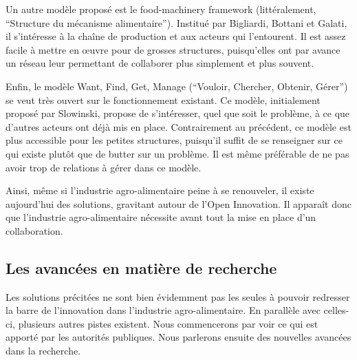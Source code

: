\documentclass[a4paper,10pt]{report}
\begin{document}
			Un autre modèle proposé est le food-machinery framework (littéralement, “Structure du mécanisme alimentaire”). Institué par Bigliardi, Bottani et Galati, il s’intéresse à la chaîne de production et aux acteurs qui l’entourent\cite{FMF}. Il est assez facile à mettre en œuvre pour de grosses structures, puisqu’elles ont par avance un réseau leur permettant de collaborer plus simplement et plus souvent.
			
			Enfin, le modèle Want, Find, Get, Manage (“Vouloir, Chercher, Obtenir, Gérer”) se veut très ouvert sur le fonctionnement existant. Ce modèle, initialement proposé par Slowinski\cite{WFGM}, propose de s’intéresser, quel que soit le problème, à ce que d’autres acteurs ont déjà mis en place. Contrairement au précédent, ce modèle est plus accessible pour les petites structures, puisqu’il suffit de se renseigner sur ce qui existe plutôt que de butter sur un problème. Il est même préférable de ne pas avoir trop de relations à gérer dans ce modèle.
			
			Ainsi, même si l’industrie agro-alimentaire peine à se renouveler, il existe aujourd’hui des solutions, gravitant autour de l’Open Innovation. Il apparaît donc que l’industrie agro-alimentaire nécessite avant tout la mise en place d’un collaboration.
			
		\subsection{Les avancées en matière de recherche}
			Les solutions précitées ne sont bien évidemment pas les seules à pouvoir redresser la barre de l’innovation dans l’industrie agro-alimentaire. En parallèle avec celles-ci, plusieurs autres pistes existent. Nous commencerons par voir ce qui est apporté par les autorités publiques. Nous parlerons ensuite des nouvelles avancées dans la recherche.
			
\end{document}
